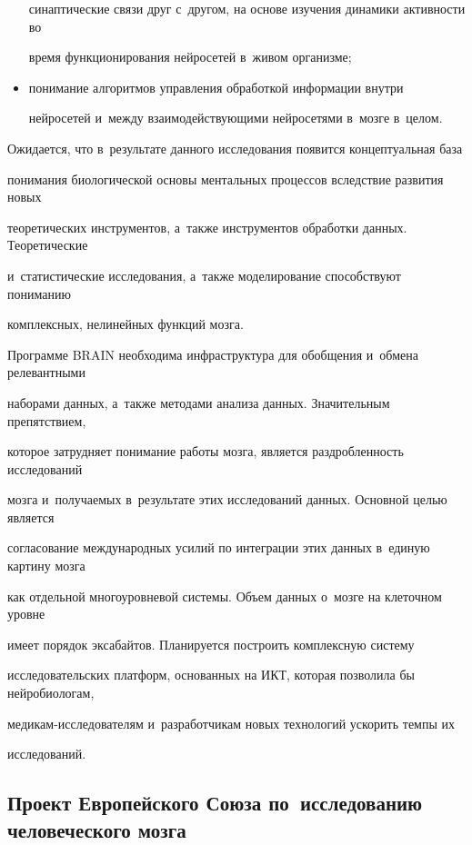 \begin{multicols}{2}
\begin{itemize}
синаптические связи друг с~другом, на основе изучения динамики активности во 


время функционирования нейросетей в~живом организме;


\item понимание алгоритмов управления обработкой информации внутри 


нейросетей и~между взаимодействующими нейросетями в~мозге в~целом.


\end{itemize}





  Ожидается, что в~результате данного исследования появится концептуальная база 


понимания биологической основы ментальных процессов вследствие развития новых 


теоретических инструментов, а~также инструментов обработки данных. Теоретические 


и~статистические исследования, а~также моделирование способствуют пониманию 


комплексных, нелинейных функций мозга. 


  


  Программе BRAIN необходима инфраструктура для обобщения и~обмена релевантными 


наборами данных, а~также методами анализа данных. Значительным препятствием, 


которое затрудняет понимание работы мозга, является раздробленность исследований 


мозга и~получаемых в~результате этих исследований данных. Основной целью является 


согласование международных усилий по интеграции этих данных в~единую картину мозга 


как отдельной многоуровневой системы. Объем данных о~мозге на клеточном уровне 


имеет порядок эксабайтов. Планируется построить комплексную систему 


исследовательских платформ, основанных на ИКТ, которая позволила бы нейробиологам, 


ме\-ди\-кам-ис\-сле\-до\-ва\-те\-лям и~разработчикам новых технологий ускорить темпы их 


исследований. 


  


\subsection{Проект Европейского Союза по~исследованию человеческого мозга}






\end{multicols}
